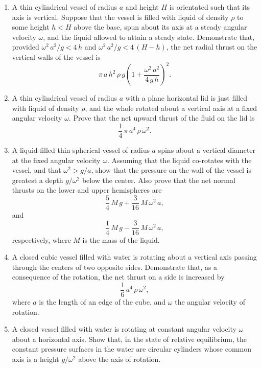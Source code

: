 {\begin{enumerate}
weight being suspended from a fixed point on this axis by a string of length $l$. Prove that the
position in which the weight hangs vertically downward is stable or unstable depending on whether $l< g/\omega^2$ or $l>g/\omega^2$,
respectively. Also, show that if the vertical position is unstable then there exists a stable inclined position in which the
string is normal to the surface of equal pressure passing though the weight.
\item A thin cylindrical vessel of radius $a$ and height $H$ is orientated such that its axis is vertical. Suppose that the
vessel is filled with liquid of density $\rho$ to 
some height $h<H$ above the base, spun about its axis at a steady angular velocity $\omega$, and the liquid
allowed to attain a steady state. Demonstrate that, provided $\omega^2\,a^2/g < 4\,h$ and $\omega^2\,a^2/g< 4\,(H-h)$,
the net radial thrust on the vertical walls of the vessel is
$$
\pi\,a\,h^2\,\rho\,g\left(1+ \frac{\omega^2\,a^2}{4\,g\,h}\right)^2.
$$
\item A thin cylindrical vessel of radius $a$ with a plane horizontal lid is just filled with liquid of density $\rho$, and
the whole rotated about a vertical axis at a fixed angular velocity $\omega$. Prove that the net upward thrust of the
fluid on the lid is
$$
\frac{1}{4}\,\pi\,a^4\,\rho\,\omega^2.
$$
\item A liquid-filled thin spherical vessel of radius $a$ spins about a vertical diameter at the fixed angular velocity $\omega$.
Assuming that the liquid co-rotates with the vessel, and that $\omega^2>g/a$, show that the pressure on the wall of the
vessel is greatest  a depth $g/\omega^2$ below the center. Also prove that the net normal thrusts on the lower
and upper hemispheres are
$$
\frac{5}{4}\,M\,g+ \frac{3}{16}\,M\,\omega^2\,a,
$$
and
$$
\frac{1}{4}\,M\,g - \frac{3}{16}\,M\,\omega^2\,a,
$$
respectively,
where $M$ is the mass of the liquid.
\item A closed cubic vessel filled with water is rotating about a vertical axis passing through the centers of two opposite sides.
Demonstrate that, as a consequence of the rotation, the net thrust on a side is increased by
$$
\frac{1}{6}\,a^4\,\rho\,\omega^2,
$$
where $a$ is the length of an edge of the cube, and $\omega$  the angular velocity of rotation.
\item A closed vessel filled with water is rotating at constant angular velocity $\omega$ about a horizontal axis. Show that,
in the state of relative equilibrium, the constant pressure surfaces in the water are circular cylinders whose common axis
is a height $g/\omega^2$ above the axis of rotation.

\end{enumerate}}